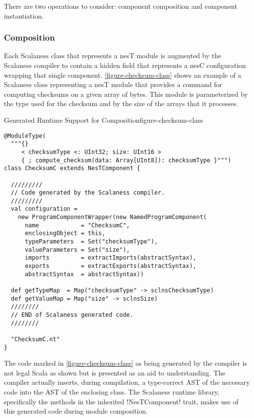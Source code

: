 There are two operations to consider: component composition and component instantiation.

\subsubsection{Composition}
\label{section-composition}

Each Scalaness class that represents a nesT module is augmented by the Scalaness compiler to
contain a hidden field that represents a nesC configuration wrapping that single component.
\autoref{figure-checksum-class} shows an example of a Scalaness class representing a nesT module
that provides a command for computing checksums on a given array of bytes. This module is
parameterized by the type used for the checksum and by the size of the arrays that it processes.

\singlespace
\begin{fpfig}[tbhp]{Generated Runtime Support for Composition}{figure-checksum-class}
{
\begin{lstlisting}[language=scalaness]
@ModuleType(
  """{}
     < checksumType <: UInt32; size: UInt16 >
     { ; compute_checksum(data: Array[UInt8]): checksumType }""")
class ChecksumC extends NesTComponent {

  /////////
  // Code generated by the Scalaness compiler.
  /////////
  val configuration =
    new ProgramComponentWrapper(new NamedProgramComponent(
      name            = "ChecksumC",
      enclosingObject = this,
      typeParameters  = Set("checksumType"),
      valueParameters = Set("size"),
      imports         = extractImports(abstractSyntax),
      exports         = extractExports(abstractSyntax),
      abstractSyntax  = abstractSyntax))
    
  def getTypeMap  = Map("checksumType" -> sclnsChecksumType)
  def getValueMap = Map("size" -> sclnsSize)
  ////////
  // END of Scalaness generated code.
  //////// 
           
  "ChecksumC.nt"
}
\end{lstlisting}
}
\end{fpfig}
\primaryspacing

The code marked in \autoref{figure-checksum-class} as being generated by the compiler is not
legal Scala as shown but is presented as an aid to understanding. The compiler actually inserts,
during compilation, a type-correct AST of the necessary code into the AST of the enclosing
class. The Scalaness runtime library, specifically the methods in the inherited !NesTComponent!
trait, makes use of this generated code during module composition.

